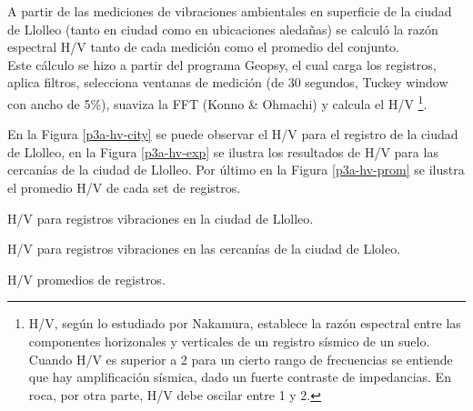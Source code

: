 A partir de las mediciones de vibraciones ambientales en superficie de la ciudad de Llolleo (tanto en ciudad como en ubicaciones aledañas) se calculó la razón espectral H/V tanto de cada medición como el promedio del conjunto. \\

Este cálculo se hizo a partir del programa Geopsy, el cual carga los registros, aplica filtros, selecciona ventanas de medición (de 30 segundos, Tuckey window con ancho de 5\%), suaviza la FFT (Konno \& Ohmachi) y calcula el H/V \footnote{H/V, según lo estudiado por Nakamura, establece la razón espectral entre las componentes horizonales y verticales de un registro sísmico de un suelo. Cuando H/V es superior a 2 para un cierto rango de frecuencias se entiende que hay amplificación sísmica, dado un fuerte contraste de impedancias. En roca, por otra parte, H/V debe oscilar entre 1 y 2.}.


En la Figura \ref{p3a-hv-city} se puede observar el H/V para el registro de la ciudad de Llolleo, en la Figura \ref{p3a-hv-exp} se ilustra los resultados de H/V para las cercanías de la ciudad de Llolleo. Por último en la Figura \ref{p3a-hv-prom} se ilustra el promedio H/V de cada set de registros.

\begin{images}[\label{p3a-hv-city}]{H/V para registros vibraciones en la ciudad de Llolleo.}
\end{images}

\begin{images}[\label{p3a-hv-exp}]{H/V para registros vibraciones en las cercanías de la ciudad de Lloleo.}
\end{images}

\begin{images}[\label{p3a-hv-prom}]{H/V promedios de registros.}
\end{images}

